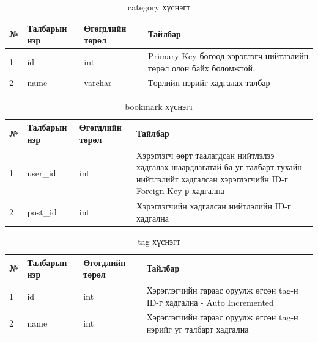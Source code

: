 \begin{table}[h]
	\caption{category хүснэгт}
	\begin{tabular}{|l|l|l|p{8cm}|}
	\hline
	№ &  Талбарын нэр & Өгөгдлийн төрөл & Тайлбар \\ \hline
	1 &  id & int & Primary Key бөгөөд хэрэглэгч нийтлэлийн төрөл олон байх боломжтой. \\ \hline
	2 &  name & varchar & Төрлийн нэрийг хадгалах талбар \\ \hline

\end{tabular}
\end{table}

\begin{table}[h]
	\caption{bookmark хүснэгт}
	\begin{tabular}{|l|l|l|p{8cm}|}
	\hline
	№ &  Талбарын нэр & Өгөгдлийн төрөл & Тайлбар \\ \hline
	1 &  user\_id & int & Хэрэглэгч өөрт таалагдсан нийтлэлээ хадгалах шаардлагатай ба уг талбарт тухайн нийтлэлийг хадгалсан хэрэглэгчийн ID-г Foreign Key-р хадгална \\ \hline
	2 &  post\_id & int & Хэрэглэгчийн хадгалсан нийтлэлийн ID-г хадгална \\ \hline

\end{tabular}
\end{table}

\begin{table}[h]
	\caption{tag хүснэгт}
	\begin{tabular}{|l|l|l|p{8cm}|}
	\hline
	№ &  Талбарын нэр & Өгөгдлийн төрөл & Тайлбар \\ \hline
	1 &  id & int & Хэрэглэгчийн гараас оруулж өгсөн tag-н ID-г хадгална - Auto Incremented \\ \hline
	2 &  name & int & Хэрэглэгчийн гараас оруулж өгсөн tag-н нэрийг уг талбарт хадгална \\ \hline

\end{tabular}
\end{table}


\clearpage





